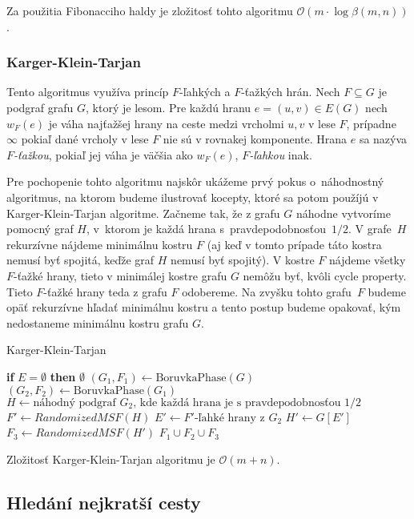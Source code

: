 Za použitia Fibonacciho haldy je zložitosť tohto algoritmu 
$\mathcal{O}(m \cdot \log\beta(m,n))$.

\subsubsection{Karger-Klein-Tarjan}

Tento algoritmus využíva princíp $F$-ľahkých a $F$-ťažkých hrán.
Nech $F\subseteq G$ je podgraf grafu $G$, ktorý je lesom. Pre
každú hranu $e=(u,v) \in E(G)$ nech $w_F(e)$ je váha najťažšej hrany
na ceste medzi vrcholmi $u,v$ v lese $F$, prípadne $\infty$ pokiaľ
dané vrcholy v lese $F$ nie sú v rovnakej komponente. Hrana $e$
sa nazýva {\em $F$-ťažkou}, pokiaľ jej váha je väčšia ako $w_F(e)$, 
{\em $F$-ľahkou} inak.

Pre pochopenie tohto algoritmu najskôr ukážeme prvý pokus o~náhodnostný
algoritmus, na ktorom budeme ilustrovať kocepty, ktoré sa potom 
použíjú v Karger-Klein-Tarjan algoritme. Začneme tak, že z grafu $G$ náhodne
vytvoríme pomocný graf $H$, v~ktorom je každá hrana s~pravdepodobnosťou~$1/2$. 
V grafe~$H$ rekurzívne nájdeme minimálnu kostru $F$ (aj keď v tomto prípade
táto kostra nemusí byť spojitá, keďže graf $H$ nemusí byť spojitý).
V kostre $F$ nájdeme všetky $F$-ťažké hrany, tieto v minimálej 
kostre grafu $G$ nemôžu byť, kvôli cycle property. Tieto $F$-ťažké
hrany teda z grafu $F$ odobereme. Na zvyšku tohto grafu~$F$ budeme
opäť rekurzívne hľadať minimálnu kostru a tento postup budeme opakovať, kým
nedostaneme minimálnu kostru grafu $G$.

\begin{algorithm}
\caption{Karger-Klein-Tarjan}
\begin{algorithmic}[1]
    \State \textbf{if} {$E = \emptyset$} \textbf{then} \Return $\emptyset$
    \State $(G_1, F_1) \gets \text{BoruvkaPhase}(G)$
	\State $(G_2, F_2) \gets \text{BoruvkaPhase}(G_1)$
	\State $H \gets \text{náhodný podgraf }G_2\text{, kde každá hrana je s pravdepodobnosťou }1/2$
	\State $F' \gets RandomizedMSF(H)$
	\State $E' \gets F'\text{-ľahké hrany z }G_2$
	\State $H' \gets G[E']$
	\State $F_3 \gets RandomizedMSF(H')$
    \State \Return $F_1 \cup F_2 \cup F_3$
\EndFunction
\end{algorithmic}
\end{algorithm}

Zložitosť Karger-Klein-Tarjan algoritmu je $\mathcal{O}(m+n)$.

\subsection{Hledání nejkratší cesty}

